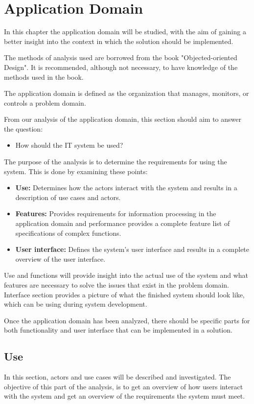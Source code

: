 \section{Application Domain}

In this chapter the application domain will be studied, with the aim of gaining a better insight into the context in which the solution should be implemented.

The methods of analysis used are borrowed from the book "Objected-oriented Design"\citep{FACTORPage}. It is recommended, although not necessary, to have knowledge of the methods used in the book.

The application domain is defined as the organization that manages, monitors, or controls a problem domain.

From our analysis of the application domain, this section should aim to answer the question:
\begin{itemize}
    \item How should the IT system be used?
\end{itemize}


The purpose of the analysis is to determine the requirements for using the system. This is done by examining these points:
\begin{itemize}
\item \textbf{Use:} Determines how the actors interact with the system and results in a description
of use cases and actors.
\item \textbf{Features:} Provides requirements for information processing in the application domain and performance
provides a complete feature list of specifications of complex functions.
\item \textbf{User interface:} Defines the system's user interface and results in a complete overview of the user interface.
\end{itemize}

Use and functions will provide insight into the actual use of the system and what features are
necessary to solve the issues that exist in the problem domain.
Interface section provides a picture of what the finished system should look like, which can be using during system development.

Once the application domain has been analyzed, there should be specific parts for both functionality and user interface that can be implemented in a solution.

\subsection{Use}
In this section, actors and use cases will be described and investigated. The objective of this part of the analysis, is to get an overview of how users interact with the system and get an overview of the requirements the system must meet.

